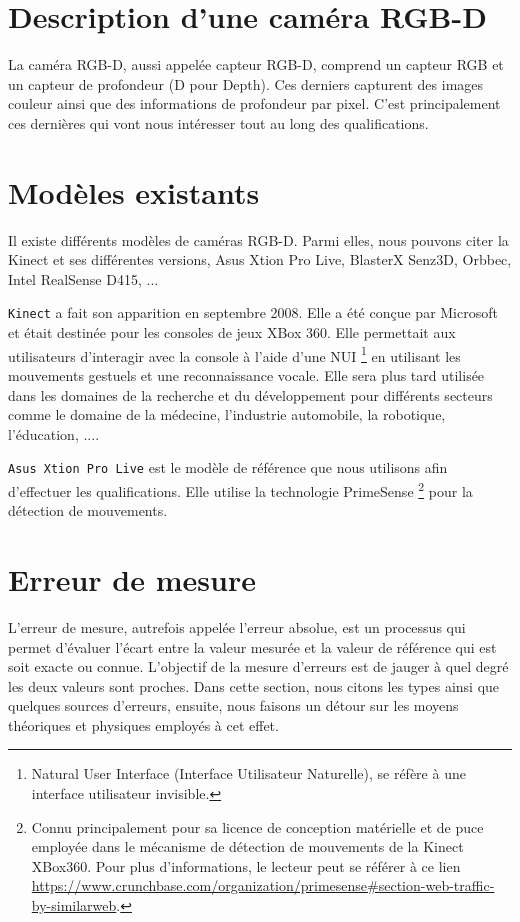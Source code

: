 \documentclass[a4paper, 12pt]{book}
\begin{document}
\section{Description d'une caméra RGB-D}

La caméra RGB-D, aussi appelée capteur RGB-D, comprend un capteur RGB et un capteur de profondeur (D pour Depth). Ces derniers capturent des images couleur ainsi que des informations de profondeur par pixel. C'est principalement ces dernières qui vont nous intéresser tout au long des qualifications.


\section{Modèles existants}
Il existe différents modèles de caméras RGB-D. Parmi elles, nous pouvons citer la Kinect et ses différentes versions, Asus Xtion Pro Live, BlasterX Senz3D, Orbbec, Intel RealSense D415, ... 
\par \texttt{Kinect} a fait son apparition en septembre 2008. Elle a été conçue par Microsoft et était destinée pour les consoles de jeux XBox 360. Elle permettait aux utilisateurs d'interagir avec la console à l'aide d'une NUI \footnote{Natural User Interface (Interface Utilisateur Naturelle), se réfère à une interface utilisateur invisible.} en utilisant les mouvements gestuels et une reconnaissance vocale. Elle sera plus tard utilisée dans les domaines de la  recherche et du développement pour différents secteurs comme le domaine de la médecine, l'industrie automobile, la robotique, l'éducation,  .... 
\par \texttt{Asus Xtion Pro Live} est le modèle de référence que nous utilisons afin d'effectuer les qualifications. Elle utilise la technologie PrimeSense  \footnote{Connu principalement pour sa licence de conception matérielle et de puce employée dans le mécanisme de détection de mouvements de la Kinect XBox360. Pour plus d'informations, le lecteur peut se référer à ce lien \url{https://www.crunchbase.com/organization/primesense#section-web-traffic-by-similarweb}.} pour la détection de mouvements.



\section{Erreur de mesure}
L'erreur de mesure, autrefois appelée l'erreur absolue, est un processus qui permet d'évaluer l'écart entre la valeur mesurée et la valeur de référence qui est soit exacte ou connue. L'objectif de la mesure d'erreurs est de jauger à quel degré les deux valeurs sont proches. 
Dans cette section, nous citons les types ainsi que quelques sources d'erreurs, ensuite,  nous faisons un détour sur les moyens théoriques et physiques employés à cet effet.
\end{document}
